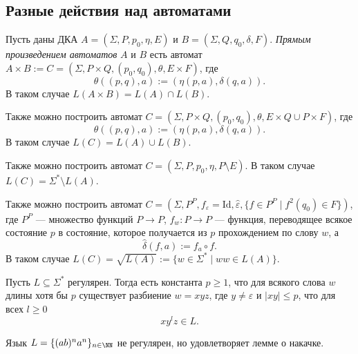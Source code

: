 \documentclass[12pt,a4paper]{article}
\newcommand{\Id}{\mathrm{Id}}
\begin{document}
    \subsection{Разные действия над автоматами}

    \begin{definition}
        Пусть даны ДКА $A = (\Sigma, P, p_0, \eta, E)$ и $B = (\Sigma, Q, q_0, \delta, F)$. \emph{Прямым произведением автоматов} $A$ и $B$ есть автомат $A \times B := C = (\Sigma, P \times Q, (p_0, q_0), \theta, E \times F)$, где
        \[\theta((p, q), a) := (\eta(p, a), \delta(q, a)).\]
        В таком случае $L(A \times B) = L(A) \cap L(B)$.

        Также можно построить автомат $C = (\Sigma, P \times Q, (p_0, q_0), \theta, E \times Q \cup P \times F)$, где
        \[\theta((p, q), a) := (\eta(p, a), \delta(q, a)).\]
        В таком случае $L(C) = L(A) \cup L(B)$.

        Также можно построить автомат $C = (\Sigma, P, p_0, \eta, P \setminus E)$. В таком случае $L(C) = \Sigma^* \setminus L(A)$.

        Также можно построить автомат $C = (\Sigma, P^P, f_\varepsilon = \Id, \widehat{\varepsilon}, \{f \in P^P \mid f^2(q_0) \in F\})$, где $P^P$ --- множество функций $P \to P$, $f_w: P \to P$ --- функция, переводящее всякое состояние $p$ в состояние, которое получается из $p$ прохождением по слову $w$, а
        \[\widehat{\delta}(f, a) := f_a \circ f.\]
        В таком случае $L(C) = \sqrt{L(A)} := \{w \in \Sigma^* \mid ww \in L(A)\}$.
    \end{definition}

    \begin{lemma}
        Пусть $L \subseteq \Sigma^*$ регулярен. Тогда есть константа $p \geqslant 1$, что для всякого слова $w$ длины хотя бы $p$ существует разбиение $w = xyz$, где $y \neq \varepsilon$ и $|xy| \leqslant p$, что для всех $l \geqslant 0$
        \[x y^l z \in L.\]
    \end{lemma}

    \begin{example}
        Язык $L = \{(ab)^n a^n\}_{n \in \NN}$ не регулярен, но удовлетворяет лемме о накачке.
    \end{example}

\end{document}
